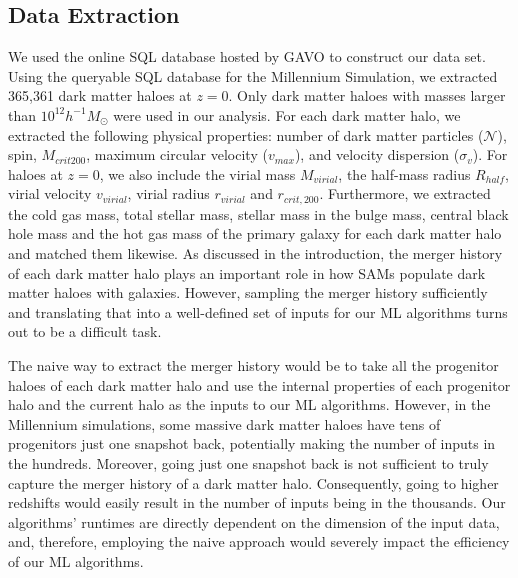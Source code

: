\documentclass[a4paper,fleqn,usenatbib]{mnras}
\begin{document}
\subsection{Data Extraction} \label{data_extraction}

We used the online SQL database hosted by GAVO \citep{lemson2006halo} to construct our data set. Using the queryable SQL database for the Millennium Simulation, we extracted 365,361 dark matter haloes at $z=0$. Only dark matter haloes with masses larger than $10^{12} h^{-1}M_{\odot}$ were used in our analysis. For each dark matter halo, we extracted the following physical properties: number of dark matter particles ($\mathcal{N}$), spin, $M_{crit200}$, maximum circular velocity ($v_{max}$), and velocity dispersion ($\sigma_v$). For haloes at $z=0$, we also include the virial mass $M_{virial}$, the half-mass radius $R_{half}$, virial velocity $v_{virial}$, virial radius $r_{virial}$ and $r_{crit,200}$. Furthermore, we extracted the cold gas mass, total stellar mass, stellar mass in the bulge mass, central black hole mass and the hot gas mass of the primary galaxy for each dark matter halo and matched them likewise. As discussed in the introduction, the merger history of each dark matter halo plays an important role in how SAMs populate dark matter haloes with galaxies. However, sampling the merger history sufficiently and translating that into a well-defined set of inputs for our ML algorithms turns out to be a difficult task. 
\par	The naive way to extract the merger history would be to take all the progenitor haloes of each dark matter halo and use the internal properties of each progenitor halo and the current halo as the  inputs to our ML algorithms. However, in the Millennium simulations, some massive dark matter haloes have tens of progenitors just one snapshot back, potentially making the number of inputs in the hundreds. Moreover, going just one snapshot back is not sufficient to truly capture the merger history of a dark matter halo. Consequently, going to higher redshifts would easily result in the number of inputs being in the thousands. Our algorithms' runtimes are directly dependent on the dimension of the input data, and, therefore, employing the naive approach would severely impact the efficiency of our ML algorithms. 
\end{document}
